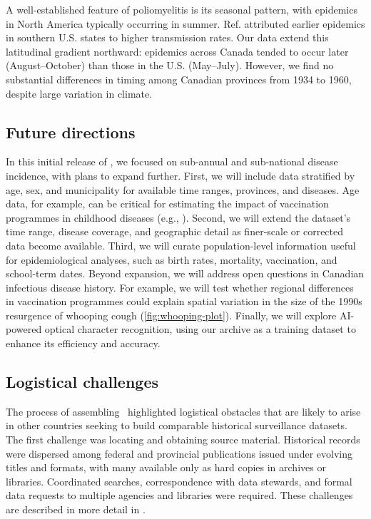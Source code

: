 \documentclass[12pt]{article}
\begin{document}
A well-established feature of poliomyelitis is its seasonal pattern, with epidemics in North America typically occurring in summer. Ref. \cite{martinez2015unraveling} attributed earlier epidemics in southern U.S. states to higher transmission rates. Our data extend this latitudinal gradient northward: epidemics across Canada tended to occur later (August--October) than those in the U.S. (May--July). However, we find no substantial differences in timing among Canadian provinces from 1934 to 1960, despite large variation in climate.

\subsection{Future directions}\label{sec:future}

In this initial release of \datacronym, we focused on sub-annual and sub-national disease incidence, with plans to expand further. First, we will include data stratified by age, sex, and municipality for available time ranges, provinces, and diseases. Age data, for example, can be critical for estimating the impact of vaccination programmes in childhood diseases (e.g., \cite{wilkinson2022impact}). Second, we will extend the dataset's time range, disease coverage, and geographic detail as finer-scale or corrected data become available. Third, we will curate population-level information useful for epidemiological analyses, such as birth rates, mortality, vaccination, and school-term dates. Beyond expansion, we will address open questions in Canadian infectious disease history. For example, we will test whether regional differences in vaccination programmes could explain spatial variation in the size of the 1990s resurgence of whooping cough (\cref{fig:whooping-plot}). Finally, we will explore AI-powered optical character recognition, using our archive as a training dataset to enhance its efficiency and accuracy.

\subsection{Logistical challenges}\label{sec:logistics}

The process of assembling \datacronym\ highlighted logistical obstacles that are likely to arise in other countries seeking to build comparable historical surveillance datasets. The first challenge was locating and obtaining source material. Historical records were dispersed among federal and provincial publications issued under evolving titles and formats, with many available only as hard copies in archives or libraries. Coordinated searches, correspondence with data stewards, and formal data requests to multiple agencies and libraries were required. These challenges are described in more detail in .
\end{document}
